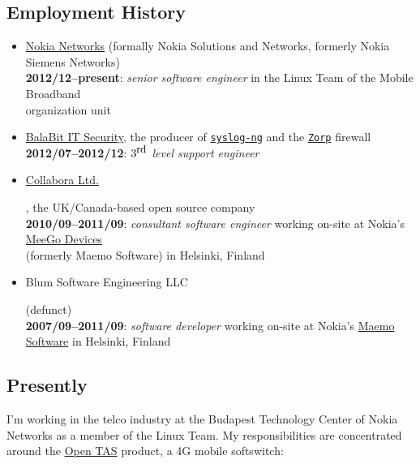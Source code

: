 \documentclass[a4paper,12pt]{article}
\newcommand{\compress}{\setlength\itemsep{-\parskip}}
\newenvironment{compressedItemize}{\begin{itemize}\compress}{\end{itemize}}
\begin{document}
\subsection*{Employment History}

\begin{compressedItemize}
\item	\href{http://nsn.com}{Nokia Networks}
	(formally Nokia Solutions and Networks,
	formerly Nokia Siemens Networks) \\
	\textbf{2012/12--present}: \textit{senior software engineer}
	in the Linux Team of the Mobile Broadband \\ organization unit
\item	\href{http://balabit.com}{BalaBit IT Security}, the producer of
	\href{http://www.balabit.com/network-security/syslog-ng/opensource-logging-system}{\texttt{syslog-ng}} and the
	\href{http://www.balabit.com/network-security/zorp-gpl}{\texttt{Zorp}}
	firewall \\
	\textbf{2012/07--2012/12}:
	\textit{$3^{\textrm{\small rd}}$ level support engineer}
\item	\hypertarget{MeeGo}{\href{http://www.collabora.com}{Collabora Ltd.}},
	the UK/Canada-based open source company \\
	\textbf{2010/09--2011/09}: \textit{consultant software engineer}
	working on-site at Nokia's
	\href{http://en.wikipedia.org/wiki/MeeGo}{MeeGo Devices} \\
	(formerly Maemo Software) in Helsinki, Finland
\item	\hypertarget{Maemo}{Blum Software Engineering LLC} (defunct) \\
	\textbf{2007/09--2011/09}: \textit{software developer} working on-site
	at Nokia's \href{http://maemo.org}{Maemo Software}
	in Helsinki, Finland
\end{compressedItemize}

\subsection*{Presently}

I'm working in the telco industry at the Budapest Technology Center of
Nokia Networks as a member of the Linux Team.  My responsibilities are
concentrated around the \href{http://networks.nokia.com/portfolio/products/ip-multimedia-subsystem-ims-core/open-tas}{Open TAS} product, a 4G mobile softswitch:
\end{document}
